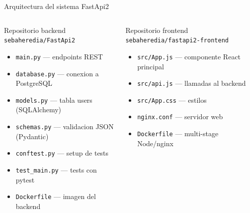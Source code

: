 \documentclass[aspectratio=169]{beamer}
\begin{document}
\begin{frame}{Arquitectura del sistema FastApi2}
  \begin{columns}
    \begin{block}{Repositorio backend}
      \texttt{sebaheredia/FastApi2}\\[0.2cm]
      \begin{itemize}
        \item \texttt{main.py} --- endpoints REST
        \item \texttt{database.py} --- conexion a PostgreSQL
        \item \texttt{models.py} --- tabla users (SQLAlchemy)
        \item \texttt{schemas.py} --- validacion JSON (Pydantic)
        \item \texttt{conftest.py} --- setup de tests
        \item \texttt{test\_main.py} --- tests con pytest
        \item \texttt{Dockerfile} --- imagen del backend
      \end{itemize}
    \end{block}

    \begin{block}{Repositorio frontend}
      \texttt{sebaheredia/fastapi2-frontend}\\[0.2cm]
      \begin{itemize}
        \item \texttt{src/App.js} --- componente React principal
        \item \texttt{src/api.js} --- llamadas al backend
        \item \texttt{src/App.css} --- estilos
        \item \texttt{nginx.conf} --- servidor web
        \item \texttt{Dockerfile} --- multi-stage Node/nginx
      \end{itemize}
    \end{block}
  \end{columns}
\end{frame}
\end{document}
